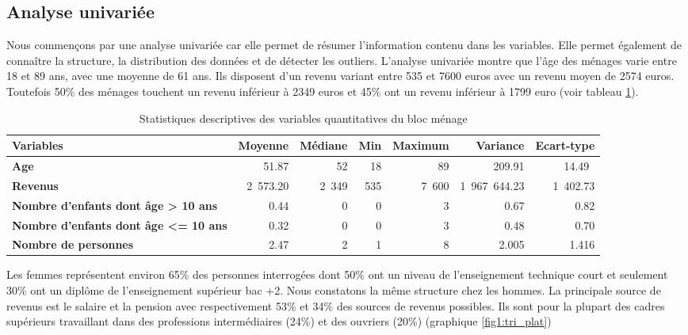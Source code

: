 \documentclass[11pt,a4paper, x11names]{article}\usepackage[]{graphicx}\usepackage[]{color}
\begin{document}
\subsection{Analyse univariée}
Nous commençons par une analyse univariée car elle permet de résumer l'information contenu dans les variables. Elle permet également de connaître la structure, la distribution des données et de détecter les outliers. 
L'analyse univariée montre que l'âge des ménages varie entre 18 et 89 ans, avec une moyenne de 61 ans. Ils disposent d'un revenu variant entre 535 et 7600 euros avec un revenu moyen de 2574 euros. Toutefois 50\% des ménages touchent un revenu inférieur à 2349 euros et 45\% ont un revenu inférieur à 1799 euro (voir tableau \ref{tab:tab1}).
\begin{table}[H] \centering
\begin{small}
\begin{tabular}{@{}lrrrrrr@{}}\toprule
\textbf{Variables}& \textbf{Moyenne} & \textbf{Médiane}& \textbf{Min} & \textbf{Maximum} & \textbf{Variance} & \textbf{Ecart-type} \\ \midrule
\textbf{Age}          & 51.87 &  52 & 18 & 89 & 209.91 & 14.49\ \\ \hdashline
\textbf{Revenus}      & 2~573.20 & 2~349 & 535&7~600 & 1~967~644.23&1~402.73   \\ \hdashline
\textbf{Nombre d'enfants dont âge > 10 ans} &  0.44 & 0 & 0 & 3 & 0.67 & 0.82  \\  \hdashline
\textbf{Nombre d'enfants dont âge <= 10 ans} &  0.32 & 0 & 0 & 3 & 0.48 & 0.70 \\
\textbf{Nombre de personnes} &  2.47 & 2 & 1 & 8 & 2.005& 1.416 \\
\bottomrule
\end{tabular}
\end{small}
\caption{Statistiques descriptives des variables quantitatives du bloc ménage}\label{tab:tab1}
\end{table}
Les femmes représentent environ 65\% des personnes interrogées dont 50\% ont un niveau de l'enseignement technique court et seulement 30\% ont un diplôme de l'enseignement supérieur bac +2. Nous constatons la même structure chez les hommes. La principale source de revenus est le salaire et la pension avec respectivement 53\% et 34\% des sources de revenus possibles. Ils sont pour la plupart des cadres supérieurs travaillant dans des professions intermédiaires (24\%) et des ouvriers (20\%) (graphique \ref{fig1:tri_plat})
\end{document}
